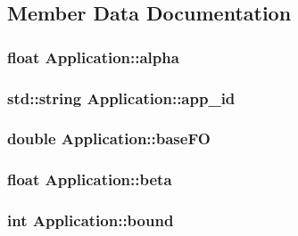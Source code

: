 \subsection{Member Data Documentation}
\hypertarget{classApplication_a087ef34a09792f2954940324dcea20d6}{
\subsubsection[{alpha}]{\setlength{\rightskip}{0pt plus 5cm}float Application\-::alpha}}\label{classApplication_a087ef34a09792f2954940324dcea20d6}
\hypertarget{classApplication_a05377e6cdcb9d48f29e0f1972a4a16fe}{
\subsubsection[{app\-\_\-id}]{\setlength{\rightskip}{0pt plus 5cm}std\-::string Application\-::app\-\_\-id}}\label{classApplication_a05377e6cdcb9d48f29e0f1972a4a16fe}
\hypertarget{classApplication_aa703e7525d446d98b5cd51c959d35998}{
\subsubsection[{base\-F\-O}]{\setlength{\rightskip}{0pt plus 5cm}double Application\-::base\-F\-O}}\label{classApplication_aa703e7525d446d98b5cd51c959d35998}
\hypertarget{classApplication_a7c74ef816a425a4115005d15d01ac9c6}{
\subsubsection[{beta}]{\setlength{\rightskip}{0pt plus 5cm}float Application\-::beta}}\label{classApplication_a7c74ef816a425a4115005d15d01ac9c6}
\hypertarget{classApplication_a6e91bef9d503af0e8ba38c8f445c8cb0}{
\subsubsection[{bound}]{\setlength{\rightskip}{0pt plus 5cm}int Application\-::bound}}\label{classApplication_a6e91bef9d503af0e8ba38c8f445c8cb0}
